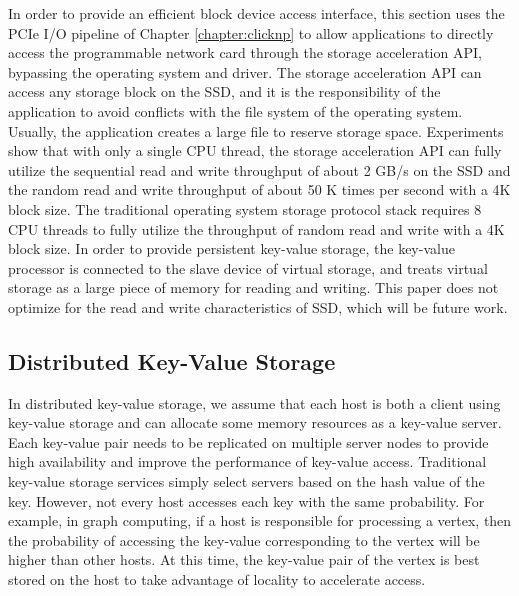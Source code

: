 In order to provide an efficient block device access interface, this section uses the PCIe I/O pipeline of Chapter \ref{chapter:clicknp} to allow applications to directly access the programmable network card through the storage acceleration API, bypassing the operating system and driver.
The storage acceleration API can access any storage block on the SSD, and it is the responsibility of the application to avoid conflicts with the file system of the operating system. Usually, the application creates a large file to reserve storage space.
Experiments show that with only a single CPU thread, the storage acceleration API can fully utilize the sequential read and write throughput of about 2 GB/s on the SSD and the random read and write throughput of about 50 K times per second with a 4K block size.
The traditional operating system storage protocol stack requires 8 CPU threads to fully utilize the throughput of random read and write with a 4K block size.
In order to provide persistent key-value storage, the key-value processor is connected to the slave device of virtual storage, and treats virtual storage as a large piece of memory for reading and writing.
This paper does not optimize for the read and write characteristics of SSD, which will be future work.

\subsection{Distributed Key-Value Storage}

In distributed key-value storage, we assume that each host is both a client using key-value storage and can allocate some memory resources as a key-value server. Each key-value pair needs to be replicated on multiple server nodes to provide high availability and improve the performance of key-value access. Traditional key-value storage services simply select servers based on the hash value of the key. However, not every host accesses each key with the same probability. For example, in graph computing, if a host is responsible for processing a vertex, then the probability of accessing the key-value corresponding to the vertex will be higher than other hosts. At this time, the key-value pair of the vertex is best stored on the host to take advantage of locality to accelerate access.

